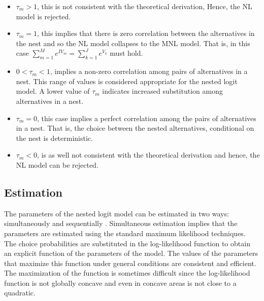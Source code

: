 \documentclass[a4paper,11pt]{article}
\begin{document}
    \begin{itemize}
        \item $\tau_{m} > 1$, this is not consistent with the theoretical derivation, Hence, the NL model is rejected.
        \item $\tau_{m} = 1$, this implies that there is zero correlation between the alternatives in the nest and so the NL model collapses to the MNL model. That is, in this case $\sum_{m=1}^{M}e^{IV_{m}} = \sum_{k=1}^{J}e^{V_{k}}$ must hold.
        \item $0 < \tau_{m} < 1$, implies a non-zero correlation among pairs of alternatives in a nest. This range of values is considered appropriate for the nested logit model. A lower value of $\tau_{m}$ indicates increased substitution among alternatives in a nest.
        \item $\tau_{m} = 0$, this case implies a perfect correlation among the pairs of alternatives in a nest. That is, the choice between the nested alternatives, conditional on the nest is deterministic.
        \item $\tau_{m} < 0$, is as well not consistent with the theoretical derivation and hence, the NL model can be rejected.
    \end{itemize}

\subsection{Estimation}
\label{subsec: Estimation}

    The parameters of the nested logit model can be estimated in two ways: simultaneously and sequentially \cite{Train}. Simultaneous estimation implies that the parameters are estimated using the standard maximum likelihood techniques. The choice probabilities are substituted in the log-likelihood function to obtain an explicit function of the parameters of the model. The values of the parameters that maximize this function under general conditions are consistent and efficient. The maximization of the function is sometimes difficult since the log-likelihood function is not globally concave and even in concave areas is not close to a quadratic.\\
\end{document}
